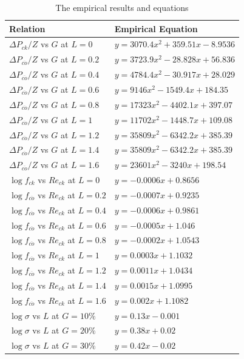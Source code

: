 \begin{table}[H]
    \centering
    \caption{The empirical results and equations}
    \label{tab:empirical}
    \begin{tabular}{ll}
        \hline
        \textbf{Relation} & \textbf{Empirical Equation} \\
        \hline
        $\Delta P_{ck}/Z$ vs $G$ at $L = 0$ & $y = 3070.4x^2 + 359.51x - 8.9536$ \\
        $\Delta P_{c\ddot{o}}/Z$ vs $G$ at $L = 0.2$ & $y = 3723.9x^2 - 28.828x + 56.836$ \\
        $\Delta P_{c\ddot{o}}/Z$ vs $G$ at $L = 0.4$ & $y = 4784.4x^2 - 30.917x + 28.029$ \\
        $\Delta P_{c\ddot{o}}/Z$ vs $G$ at $L = 0.6$ & $y = 9146x^2 - 1549.4x + 184.35$ \\
        $\Delta P_{c\ddot{o}}/Z$ vs $G$ at $L = 0.8$ & $y = 17323x^2 - 4402.1x + 397.07$ \\
        $\Delta P_{c\ddot{o}}/Z$ vs $G$ at $L = 1$ & $y = 11702x^2 - 1448.7x + 109.08$ \\
        $\Delta P_{c\ddot{o}}/Z$ vs $G$ at $L = 1.2$ & $y = 35809x^2 - 6342.2x + 385.39$ \\
        $\Delta P_{c\ddot{o}}/Z$ vs $G$ at $L = 1.4$ & $y = 35809x^2 - 6342.2x + 385.39$ \\
        $\Delta P_{c\ddot{o}}/Z$ vs $G$ at $L = 1.6$ & $y = 23601x^2 - 3240x + 198.54$ \\
        \hline
        $\log f_{ck}$ vs $Re_{ck}$ at $L = 0$ & $y = -0.0006x + 0.8656$ \\
        $\log f_{c\ddot{o}}$ vs $Re_{ck}$ at $L = 0.2$ & $y = -0.0007x + 0.9235$ \\
        $\log f_{c\ddot{o}}$ vs $Re_{ck}$ at $L = 0.4$ & $y = -0.0006x + 0.9861$ \\
        $\log f_{c\ddot{o}}$ vs $Re_{ck}$ at $L = 0.6$ & $y = -0.0005x + 1.046$ \\
        $\log f_{c\ddot{o}}$ vs $Re_{ck}$ at $L = 0.8$ & $y = -0.0002x + 1.0543$ \\
        $\log f_{c\ddot{o}}$ vs $Re_{ck}$ at $L = 1$ & $y = 0.0003x + 1.1032$ \\
        $\log f_{c\ddot{o}}$ vs $Re_{ck}$ at $L = 1.2$ & $y = 0.0011x + 1.0434$ \\
        $\log f_{c\ddot{o}}$ vs $Re_{ck}$ at $L = 1.4$ & $y = 0.0015x + 1.0995$ \\
        $\log f_{c\ddot{o}}$ vs $Re_{ck}$ at $L = 1.6$ & $y = 0.002x + 1.1082$ \\
        \hline
        $\log \sigma$ vs $L$ at $G = 10\%$ & $y = 0.13x - 0.001$ \\
        $\log \sigma$ vs $L$ at $G = 20\%$ & $y = 0.38x + 0.02$ \\
        $\log \sigma$ vs $L$ at $G = 30\%$ & $y = 0.42x - 0.02$ \\
        \hline
    \end{tabular}
\end{table}
